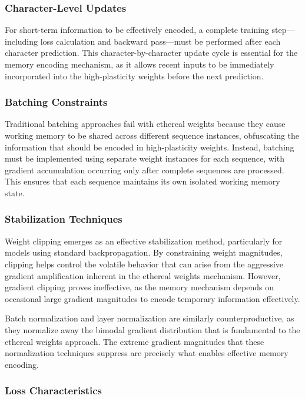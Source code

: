 \documentclass{article} %
\begin{document}
\subsubsection{Character-Level Updates}

For short-term information to be effectively encoded, a complete training step—including loss calculation and backward pass—must be performed after each character prediction. This character-by-character update cycle is essential for the memory encoding mechanism, as it allows recent inputs to be immediately incorporated into the high-plasticity weights before the next prediction.

\subsubsection{Batching Constraints}

Traditional batching approaches fail with ethereal weights because they cause working memory to be shared across different sequence instances, obfuscating the information that should be encoded in high-plasticity weights. Instead, batching must be implemented using separate weight instances for each sequence, with gradient accumulation occurring only after complete sequences are processed. This ensures that each sequence maintains its own isolated working memory state.

\subsubsection{Stabilization Techniques}

Weight clipping emerges as an effective stabilization method, particularly for models using standard backpropagation. By constraining weight magnitudes, clipping helps control the volatile behavior that can arise from the aggressive gradient amplification inherent in the ethereal weights mechanism. However, gradient clipping proves ineffective, as the memory mechanism depends on occasional large gradient magnitudes to encode temporary information effectively.

Batch normalization and layer normalization are similarly counterproductive, as they normalize away the bimodal gradient distribution that is fundamental to the ethereal weights approach. The extreme gradient magnitudes that these normalization techniques suppress are precisely what enables effective memory encoding.

\subsubsection{Loss Characteristics}
\end{document}
